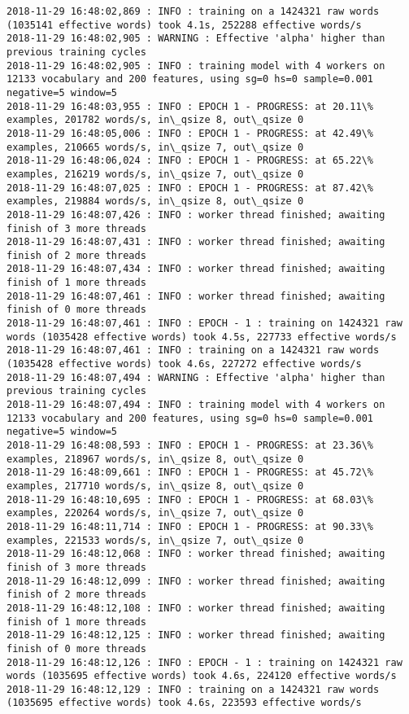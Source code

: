 \documentclass[11pt]{article}
\begin{document}
\begin{Verbatim}[commandchars=\\\{\}]
2018-11-29 16:48:02,869 : INFO : training on a 1424321 raw words (1035141 effective words) took 4.1s, 252288 effective words/s
2018-11-29 16:48:02,905 : WARNING : Effective 'alpha' higher than previous training cycles
2018-11-29 16:48:02,905 : INFO : training model with 4 workers on 12133 vocabulary and 200 features, using sg=0 hs=0 sample=0.001 negative=5 window=5
2018-11-29 16:48:03,955 : INFO : EPOCH 1 - PROGRESS: at 20.11\% examples, 201782 words/s, in\_qsize 8, out\_qsize 0
2018-11-29 16:48:05,006 : INFO : EPOCH 1 - PROGRESS: at 42.49\% examples, 210665 words/s, in\_qsize 7, out\_qsize 0
2018-11-29 16:48:06,024 : INFO : EPOCH 1 - PROGRESS: at 65.22\% examples, 216219 words/s, in\_qsize 7, out\_qsize 0
2018-11-29 16:48:07,025 : INFO : EPOCH 1 - PROGRESS: at 87.42\% examples, 219884 words/s, in\_qsize 8, out\_qsize 0
2018-11-29 16:48:07,426 : INFO : worker thread finished; awaiting finish of 3 more threads
2018-11-29 16:48:07,431 : INFO : worker thread finished; awaiting finish of 2 more threads
2018-11-29 16:48:07,434 : INFO : worker thread finished; awaiting finish of 1 more threads
2018-11-29 16:48:07,461 : INFO : worker thread finished; awaiting finish of 0 more threads
2018-11-29 16:48:07,461 : INFO : EPOCH - 1 : training on 1424321 raw words (1035428 effective words) took 4.5s, 227733 effective words/s
2018-11-29 16:48:07,461 : INFO : training on a 1424321 raw words (1035428 effective words) took 4.6s, 227272 effective words/s
2018-11-29 16:48:07,494 : WARNING : Effective 'alpha' higher than previous training cycles
2018-11-29 16:48:07,494 : INFO : training model with 4 workers on 12133 vocabulary and 200 features, using sg=0 hs=0 sample=0.001 negative=5 window=5
2018-11-29 16:48:08,593 : INFO : EPOCH 1 - PROGRESS: at 23.36\% examples, 218967 words/s, in\_qsize 8, out\_qsize 0
2018-11-29 16:48:09,661 : INFO : EPOCH 1 - PROGRESS: at 45.72\% examples, 217710 words/s, in\_qsize 8, out\_qsize 0
2018-11-29 16:48:10,695 : INFO : EPOCH 1 - PROGRESS: at 68.03\% examples, 220264 words/s, in\_qsize 7, out\_qsize 0
2018-11-29 16:48:11,714 : INFO : EPOCH 1 - PROGRESS: at 90.33\% examples, 221533 words/s, in\_qsize 7, out\_qsize 0
2018-11-29 16:48:12,068 : INFO : worker thread finished; awaiting finish of 3 more threads
2018-11-29 16:48:12,099 : INFO : worker thread finished; awaiting finish of 2 more threads
2018-11-29 16:48:12,108 : INFO : worker thread finished; awaiting finish of 1 more threads
2018-11-29 16:48:12,125 : INFO : worker thread finished; awaiting finish of 0 more threads
2018-11-29 16:48:12,126 : INFO : EPOCH - 1 : training on 1424321 raw words (1035695 effective words) took 4.6s, 224120 effective words/s
2018-11-29 16:48:12,129 : INFO : training on a 1424321 raw words (1035695 effective words) took 4.6s, 223593 effective words/s

    \end{Verbatim}
\end{document}
